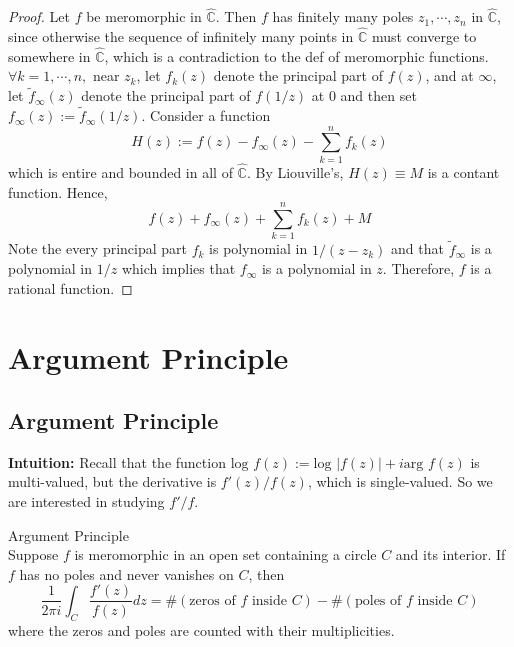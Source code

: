 \begin{proof}
    Let $f$ be meromorphic in $\widehat{\mathbb{C}}$. Then $f$ has finitely many poles $z_1 ,\cdots, z_n$ in $\widehat{\mathbb{C}}$, since otherwise the sequence of infinitely many points in $\widehat{\mathbb{C}}$ must converge to somewhere in $\widehat{\mathbb{C}}$, which is a contradiction to the def of meromorphic functions. $\forall k=1 ,\cdots, n,$ near $z_k$, let $f_k(z)$ denote the principal part of $f(z)$, and at $\infty$, let $\widetilde{f}_\infty (z)$ denote the principal part of $f(1/z)$ at $0$ and then set $f_\infty (z):= \widetilde{f}_\infty (1/z)$. Consider a function 
    \[
    H(z):= f(z)- f_\infty (z) -\sum_{k=1}^n f_k(z)
    \]
    which is entire and bounded in all of $\widehat{\mathbb C}$. By Liouville's, $H(z) \equiv M$ is a contant function. Hence,
    \[
    f(z)+ f_\infty (z)+ \sum_{k=1}^n f_k(z) +M
    \]
    Note the every principal part $f_k$ is polynomial in $1/(z-z_k)$ and that $\widetilde{f} _\infty$ is a polynomial in $1/z$ which implies that $f_\infty$ is a polynomial in $z$. Therefore, $f$ is a rational function.
\end{proof}

\section{Argument Principle}

\subsection{Argument Principle}

\noindent\textbf{Intuition:} Recall that the function $\text{log }f(z) := \text{log }|f(z)| +i\text{arg }f(z)$ is multi-valued, but the derivative is $f'(z)/f(z)$, which is single-valued. So we are interested in studying $f'/f$.

\begin{theorem}{Argument Principle}\\
Suppose $f$ is meromorphic in an open set containing a circle $C$ and its interior. If $f$ has no poles and never vanishes on $C$, then
\[
\frac{1}{2\pi i} \int_C \frac{f'(z)}{f(z)}dz= \# (\text{zeros of }f \text{ inside }C)- \# (\text{poles of }f \text{ inside }C)
\]
where the zeros and poles are counted with their multiplicities.
\end{theorem}

